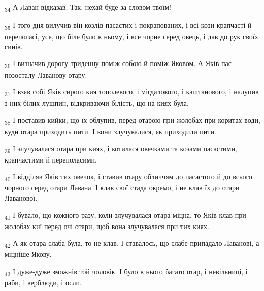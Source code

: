 \begin{tcolorbox}
\textsubscript{34} А Лаван відказав: Так, нехай буде за словом твоїм!
\end{tcolorbox}
\begin{tcolorbox}
\textsubscript{35} І того дня вилучив він козлів пасастих і покрапованих, і всі кози крапчасті й переполасі, усе, що біле було в ньому, і все чорне серед овець, і дав до рук своїх синів.
\end{tcolorbox}
\begin{tcolorbox}
\textsubscript{36} І визначив дорогу триденну поміж собою й поміж Яковом. А Яків пас позосталу Лаванову отару.
\end{tcolorbox}
\begin{tcolorbox}
\textsubscript{37} І взяв собі Яків сирого кия тополевого, і мігдалового, і каштанового, і налупив з них білих лушпин, відкриваючи білість, що на киях була.
\end{tcolorbox}
\begin{tcolorbox}
\textsubscript{38} І поставив кийки, що їх облупив, перед отарою при жолобах при коритах води, куди отара приходить пити. І вони злучувалися, як приходили пити.
\end{tcolorbox}
\begin{tcolorbox}
\textsubscript{39} І злучувалася отара при киях, і котилася овечками та козами пасастими, крапчастими й переполасими.
\end{tcolorbox}
\begin{tcolorbox}
\textsubscript{40} І відділяв Яків тих овечок, і ставив отару обличчям до пасастого й до всього чорного серед отари Лавана. І клав свої стада окремо, і не клав їх до отари Лаванової.
\end{tcolorbox}
\begin{tcolorbox}
\textsubscript{41} І бувало, що кожного разу, коли злучувалася отара міцна, то Яків клав при жолобах киї перед очі отари, щоб вона злучувалася при тих киях.
\end{tcolorbox}
\begin{tcolorbox}
\textsubscript{42} А як отара слаба була, то не клав. І ставалось, що слабе припадало Лаванові, а міцніше Якову.
\end{tcolorbox}
\begin{tcolorbox}
\textsubscript{43} І дуже-дуже зможнів той чоловік. І було в нього багато отар, і невільниці, і раби, і верблюди, і осли.
\end{tcolorbox}
